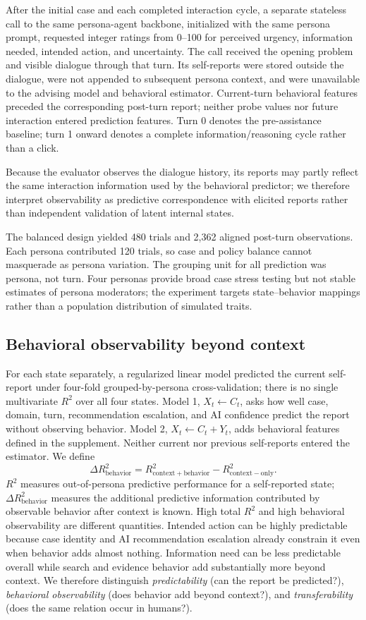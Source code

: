 \documentclass{article}
\begin{document}
After the initial case and each completed interaction cycle, a separate stateless call to the same persona-agent backbone, initialized with the same persona prompt, requested integer ratings from 0--100 for perceived urgency, information needed, intended action, and uncertainty. The call received the opening problem and visible dialogue through that turn. Its self-reports were stored outside the dialogue, were not appended to subsequent persona context, and were unavailable to the advising model and behavioral estimator. Current-turn behavioral features preceded the corresponding post-turn report; neither probe values nor future interaction entered prediction features. Turn 0 denotes the pre-assistance baseline; turn 1 onward denotes a complete information/reasoning cycle rather than a click.

Because the evaluator observes the dialogue history, its reports may partly reflect the same interaction information used by the behavioral predictor; we therefore interpret observability as predictive correspondence with elicited reports rather than independent validation of latent internal states.

The balanced design yielded 480 trials and 2,362 aligned post-turn observations. Each persona contributed 120 trials, so case and policy balance cannot masquerade as persona variation. The grouping unit for all prediction was persona, not turn. Four personas provide broad case stress testing but not stable estimates of persona moderators; the experiment targets state--behavior mappings rather than a population distribution of simulated traits.


\subsection{Behavioral observability beyond context}

For each state separately, a regularized linear model predicted the current self-report under four-fold grouped-by-persona cross-validation; there is no single multivariate $R^2$ over all four states. Model 1, $X_t\leftarrow C_t$, asks how well case, domain, turn, recommendation escalation, and AI confidence predict the report without observing behavior. Model 2, $X_t\leftarrow C_t+Y_t$, adds behavioral features defined in the supplement. Neither current nor previous self-reports entered the estimator. We define
\[
\Delta R^2_{\mathrm{behavior}}=R^2_{\mathrm{context+behavior}}-R^2_{\mathrm{context-only}}.
\]
$R^2$ measures out-of-persona predictive performance for a self-reported state; $\Delta R^2_{\mathrm{behavior}}$ measures the additional predictive information contributed by observable behavior after context is known. High total $R^2$ and high behavioral observability are different quantities. Intended action can be highly predictable because case identity and AI recommendation escalation already constrain it even when behavior adds almost nothing. Information need can be less predictable overall while search and evidence behavior add substantially more beyond context. We therefore distinguish \emph{predictability} (can the report be predicted?), \emph{behavioral observability} (does behavior add beyond context?), and \emph{transferability} (does the same relation occur in humans?).
\end{document}
